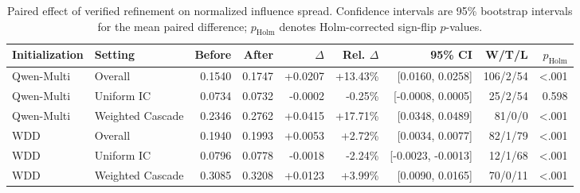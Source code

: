 \begin{table}[t]
\centering
\caption{Paired effect of verified refinement on normalized influence spread. Confidence intervals are 95\% bootstrap intervals for the mean paired difference; $p_{\mathrm{Holm}}$ denotes Holm-corrected sign-flip $p$-values.}
\label{tab:paired_effects}
\small
\begin{tabular}{llrrrrrrr}
\toprule
Initialization & Setting & Before & After & $\Delta$ & Rel. $\Delta$ & 95\% CI & W/T/L & $p_{\mathrm{Holm}}$ \\
\midrule
Qwen-Multi & Overall & 0.1540 & 0.1747 & +0.0207 & +13.43\% & [0.0160, 0.0258] & 106/2/54 & <.001 \\
Qwen-Multi & Uniform IC & 0.0734 & 0.0732 & -0.0002 & -0.25\% & [-0.0008, 0.0005] & 25/2/54 & 0.598 \\
Qwen-Multi & Weighted Cascade & 0.2346 & 0.2762 & +0.0415 & +17.71\% & [0.0348, 0.0489] & 81/0/0 & <.001 \\
WDD & Overall & 0.1940 & 0.1993 & +0.0053 & +2.72\% & [0.0034, 0.0077] & 82/1/79 & <.001 \\
WDD & Uniform IC & 0.0796 & 0.0778 & -0.0018 & -2.24\% & [-0.0023, -0.0013] & 12/1/68 & <.001 \\
WDD & Weighted Cascade & 0.3085 & 0.3208 & +0.0123 & +3.99\% & [0.0090, 0.0165] & 70/0/11 & <.001 \\
\bottomrule
\end{tabular}
\end{table}
